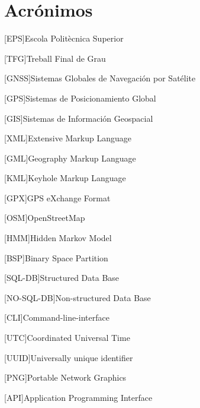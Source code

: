 \chapter{Acrónimos} %
%
%
\begin{acronym}

[EPS]{Escola Politècnica Superior}

[TFG]{Treball Final de Grau}

[GNSS]{Sistemas Globales de Navegación por Satélite}

[GPS]{Sistemas de Posicionamiento Global}

[GIS]{Sistemas de Información Geospacial}

[XML]{Extensive Markup Language}

[GML]{Geography Markup Language}

[KML]{Keyhole Markup Language}

[GPX]{GPS eXchange Format}

[OSM]{OpenStreetMap}

[HMM]{Hidden Markov Model}

[BSP]{Binary Space Partition}

[SQL-DB]{Structured Data Base}

[NO-SQL-DB]{Non-structured Data Base}

[CLI]{Command-line-interface}

[UTC]{Coordinated Universal Time}

[UUID]{Universally unique identifier}

[PNG]{Portable Network Graphics}

[API]{Application Programming Interface}

\end{acronym}
